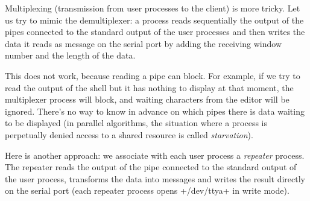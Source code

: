 \begin{myimage}[width="55\%"]
\end{myimage}
% 
Multiplexing (transmission from user processes to the client) is
more tricky. Let us try to mimic the demultiplexer: a process reads
sequentially the output of the pipes connected to the standard output
of the user processes and then writes the data it reads as message on
the serial port by adding the receiving window number and the length
of the data.
%
\begin{myimage}[width="100\%"]
\end{myimage}
% 
This does not work, because reading a pipe can block. For example, if we
try to read the output of the shell but it has nothing to
display at that moment, the multiplexer process will block, and waiting
characters from the editor will be ignored.
There's no way to know in advance on which pipes there is
data waiting to be displayed (in parallel algorithms, the situation
where a process is perpetually denied access to a shared resource is
called \emph{starvation}).

Here is another approach: we associate with each user process a
\emph{repeater} process. The repeater reads the output of the pipe
connected to the standard output of the user process, transforms the
data into messages and writes the result directly on the serial port
(each repeater process opens \ml+/dev/ttya+ in write mode).
%
\begin{myimage}[width="100\%"]
\end{myimage}
% 

